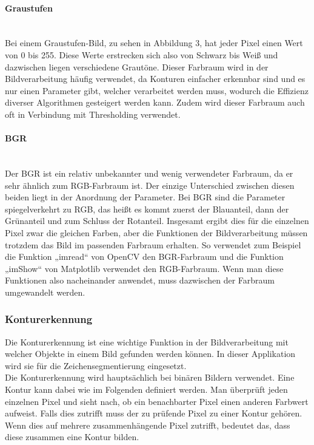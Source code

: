 \paragraph{Graustufen}\mbox{}\\
Bei einem Graustufen-Bild, zu sehen in Abbildung 3, hat jeder Pixel einen Wert von 0 bis 255. Diese Werte erstrecken sich also 
von Schwarz bis Weiß und dazwischen liegen verschiedene Grautöne. Dieser Farbraum wird in der Bildverarbeitung häufig verwendet, 
da Konturen einfacher erkennbar sind und es nur einen Parameter gibt, welcher verarbeitet werden muss, wodurch die Effizienz 
diverser Algorithmen gesteigert werden kann. Zudem wird dieser Farbraum auch oft in Verbindung mit Thresholding verwendet.

\paragraph{BGR}\mbox{}\\
Der BGR ist ein relativ unbekannter und wenig verwendeter Farbraum, da er sehr ähnlich zum RGB-Farbraum ist. Der einzige 
Unterschied zwischen diesen beiden liegt in der Anordnung der Parameter. Bei BGR sind die Parameter spiegelverkehrt zu RGB, 
das heißt es kommt zuerst der Blauanteil, dann der Grünanteil und zum Schluss der Rotanteil. Insgesamt ergibt dies für die 
einzelnen Pixel zwar die gleichen Farben, aber die Funktionen der Bildverarbeitung müssen trotzdem das Bild im passenden 
Farbraum erhalten. So verwendet zum Beispiel die Funktion „imread“ von OpenCV den BGR-Farbraum und die Funktion „imShow“ 
von Matplotlib verwendet den RGB-Farbraum. Wenn man diese Funktionen also nacheinander anwendet, muss dazwischen der Farbraum 
umgewandelt werden.

\subsubsection{Konturerkennung}
Die Konturerkennung ist eine wichtige Funktion in der Bildverarbeitung mit welcher Objekte in einem Bild gefunden werden können. 
In dieser Applikation wird sie für die Zeichensegmentierung eingesetzt.\\

Die Konturerkennung wird hauptsächlich bei binären Bildern verwendet. Eine Kontur kann dabei wie im Folgenden definiert werden. 
Man überprüft jeden einzelnen Pixel und sieht nach, ob ein benachbarter Pixel einen anderen Farbwert aufweist. Falls dies 
zutrifft muss der zu prüfende Pixel zu einer Kontur gehören. Wenn dies auf mehrere zusammenhängende Pixel zutrifft, bedeutet 
das, dass diese zusammen eine Kontur bilden.\\

